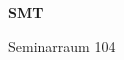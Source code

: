 \documentclass[a4paper]{article}
\begin{document}
\printGenericVSLHeader
\begin{center}
\begin{vsltext}{3cm}{4cm}

   \vspace{0.5cm} 

    \textbf{SMT} 

    \vspace{1.5cm}

    Seminarraum 104

\end{vsltext}

\end{center}
\end{document}
